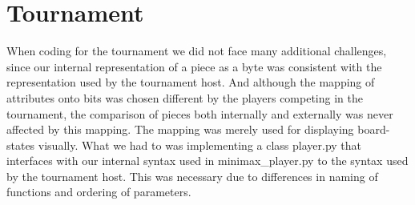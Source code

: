 \section{Tournament}\label{tournament}
When coding for the tournament we did not face many additional challenges, since our internal representation of a \quarto{} piece as a byte was consistent with the representation used by the tournament host. And although the mapping of attributes onto bits was chosen different by the players competing in the tournament, the comparison of pieces both internally and externally was never affected by this mapping. The mapping was merely used for displaying board-states visually.
What we had to was implementing a class player.py that interfaces with our internal syntax used in minimax\_player.py to the syntax used by the tournament host. This was necessary due to differences in naming of functions and ordering of parameters.